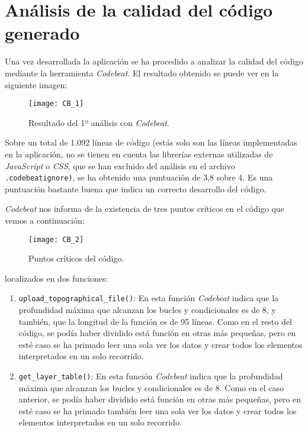 \section{Análisis de la calidad del código generado}

Una vez desarrollada la aplicación se ha procedido a analizar la calidad del código mediante la herramienta \emph{Codebeat}. El resultado obtenido se puede ver en la siguiente imagen:

\begin{figure}[!h]
	\centering
	\texttt{[image: CB\_1]}
	\caption{Resultado del 1º análisis con \emph{Codebeat}.}
	\label{fig:CB_1}
\end{figure}

Sobre un total de 1.092 líneas de código (estás solo son las  líneas implementadas en la aplicación, no se tienen en cuenta las librerías externas utilizadas de \emph{JavaScript} o \emph{CSS}, que se han excluido del análisis en el archivo \texttt{.codebeatignore)}, se ha obtenido una puntuación de 3,8 sobre 4. Es una puntuación bastante buena que indica un correcto desarrollo del código.

\emph{Codebeat} nos informa de la existencia de tres puntos críticos en el código que vemos a continuación:

\begin{figure}[!h]
	\centering
	\texttt{[image: CB\_2]}
	\caption{Puntos críticos del código.}
	\label{fig:CB_2}
\end{figure}

localizados en dos funciones:
\begin{enumerate}

\item \texttt{upload\_topographical\_file()}: En esta función \emph{Codebeat} indica que la profundidad máxima que alcanzan los bucles y condicionales es de 8, y también, que la longitud de la función es de 95 líneas. Como en el resto del código, se podía haber dividido está función en otras más pequeñas, pero en esté caso se ha primado leer una sola ver los datos y crear todos los elementos interpretados en un solo recorrido.

\item \texttt{get\_layer\_table()}: En esta función \emph{Codebeat} indica que la profundidad máxima que alcanzan los bucles y condicionales es de 8. Como en el caso anterior, se podía haber dividido está función en otras más pequeñas, pero en esté caso se ha primado también  leer una sola ver los datos y crear todos los elementos interpretados en un solo recorrido.
\end{enumerate}

